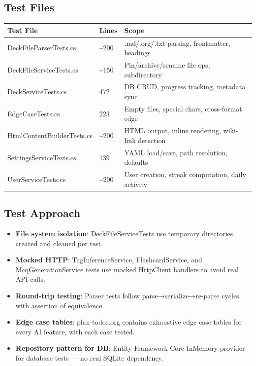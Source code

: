 \documentclass[14pt]{article}
\begin{document}
\subsection{Test Files}
\label{sec:orgc280555}
\begin{center}
\begin{tabular}{lll}
Test File & Lines & Scope\\
\hline
DeckFileParserTests.cs & \textasciitilde{}200 & .md/.org/.txt parsing, frontmatter, headings\\
DeckFileServiceTests.cs & \textasciitilde{}150 & Pin/archive/rename file ops, subdirectory\\
DeckServiceTests.cs & 472 & DB CRUD, progress tracking, metadata sync\\
EdgeCaseTests.cs & 223 & Empty files, special chars, cross-format edge\\
HtmlContentBuilderTests.cs & \textasciitilde{}200 & HTML output, inline rendering, wiki-link detection\\
SettingsServiceTests.cs & 139 & YAML load/save, path resolution, defaults\\
UserServiceTests.cs & \textasciitilde{}200 & User creation, streak computation, daily activity\\
\end{tabular}
\end{center}
\subsection{Test Approach}
\label{sec:org0c85dd1}
\begin{itemize}
\item \textbf{\textbf{File system isolation}}: DeckFileServiceTests use temporary
directories created and cleaned per test.
\item \textbf{\textbf{Mocked HTTP}}: TagInferenceService, FlashcardService, and
McqGenerationService tests use mocked HttpClient handlers to avoid
real API calls.
\item \textbf{\textbf{Round-trip testing}}: Parser tests follow parse→serialize→re-parse
cycles with assertion of equivalence.
\item \textbf{\textbf{Edge case tables}}: plan-todos.org contains exhaustive edge case
tables for every AI feature, with each case tested.
\item \textbf{\textbf{Repository pattern for DB}}: Entity Framework Core InMemory provider
for database tests — no real SQLite dependency.
\end{itemize}
\end{document}
